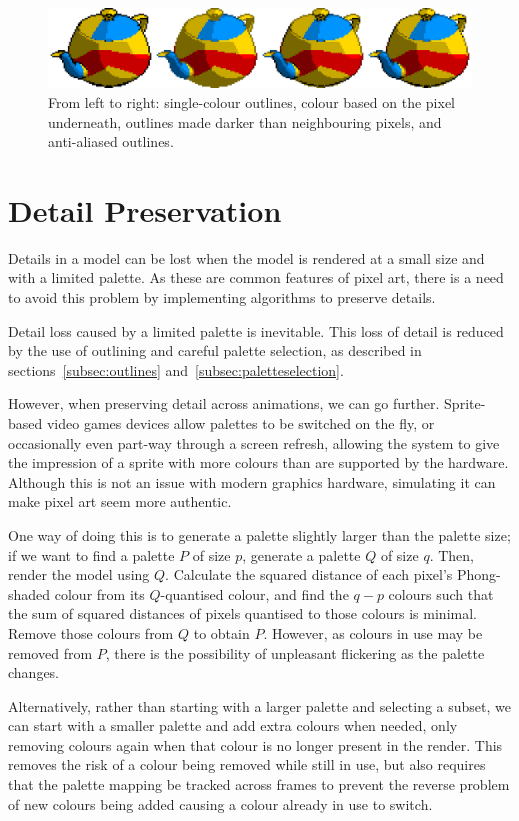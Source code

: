 \documentclass[12pt,twoside,notitlepage]{report}
\begin{document}
\begin{figure}[h!]
\centering
\includegraphics[width=\textwidth]{outlines}
\caption{From left to right: single-colour outlines, colour based on the pixel underneath, outlines made darker than neighbouring pixels, and anti-aliased outlines.}
\label{fig:outlines}
\end{figure}

\section{Detail Preservation}

Details in a model can be lost when the model is rendered at a small size and with a limited palette. As these are common features of pixel art, there is a need to avoid this problem by implementing algorithms to preserve details.

Detail loss caused by a limited palette is inevitable. This loss of detail is reduced by the use of outlining and careful palette selection, as described in sections~\ref{subsec:outlines} and~\ref{subsec:paletteselection}.

However, when preserving detail across animations, we can go further. Sprite-based video games devices allow palettes to be switched on the fly, or occasionally even part-way through a screen refresh, allowing the system to give the impression of a sprite with more colours than are supported by the hardware. Although this is not an issue with modern graphics hardware, simulating it can make pixel art seem more authentic.

One way of doing this is to generate a palette slightly larger than the palette size; if we want to find a palette $P$ of size $p$, generate a palette $Q$ of size $q$. Then, render the model using $Q$. Calculate the squared distance of each pixel's Phong-shaded colour from its $Q$-quantised colour, and find the $q - p$ colours such that the sum of squared distances of pixels quantised to those colours is minimal. Remove those colours from $Q$ to obtain $P$. However, as colours in use may be removed from $P$, there is the possibility of unpleasant flickering as the palette changes.

Alternatively, rather than starting with a larger palette and selecting a subset, we can start with a smaller palette and add extra colours when needed, only removing colours again when that colour is no longer present in the render. This removes the risk of a colour being removed while still in use, but also requires that the palette mapping be tracked across frames to prevent the reverse problem of new colours being added causing a colour already in use to switch.
\end{document}
